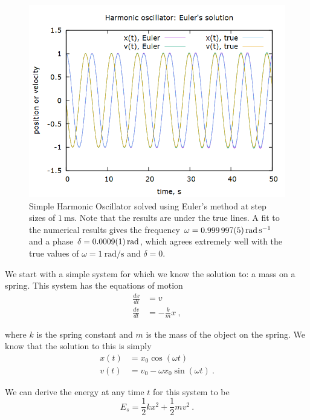 \documentclass[aps,prl,twocolumn,superscriptaddress]{revtex4-1}
\begin{document}
\begin{figure}[htbp]
  	\begin{center}
 		\includegraphics[scale=0.3]{ho1.png}
  		\caption{Simple Harmonic Oscillator solved using Euler's method at step sizes of $\SI{1}{\ms}$. Note that the results are under the true lines. A fit to the numerical results gives the frequency $\omega = \SI{0.999997 \pm 0.000005}{\radian\per\s}$ and a phase $\delta = \SI{0.0009 \pm 0.0001}{\radian}$, which agrees extremely well with the true values of $\omega = \SI{1}{\radian\per\s}$ and $\delta = 0$.}
  		\label{gr:harmosc1}
 	\end{center}
\end{figure}

We start with a simple system for which we know the solution to: a mass on a spring. This system has the equations of motion
\begin{align}
\frac{dx}{dt} &= v \label{eqn:sprx} \\
\frac{dv}{dt} &= -\frac{k}{m} x ~,  \label{eqn:sprv}
\end{align}

where $k$ is the spring constant and $m$ is the mass of the object on the spring. We know that the solution to this is simply
\begin{align}
x(t) &= x_0 \cos (\omega t) \\
v(t) &= v_0 - \omega x_0 \sin (\omega t) ~.   \label{eqn:sprsol}
\end{align}

We can derive the energy at any time $t$ for this system to be
\begin{equation}
E_s = \frac{1}{2}kx^2 + \frac{1}{2}mv^2 ~. \label{eqn:eners} 
\end{equation}
\end{document}
